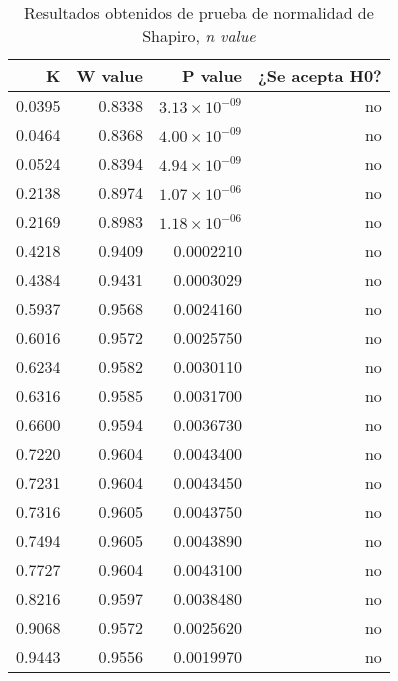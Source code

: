 \documentclass{elsarticle}
\begin{document}
\begin{table}[ht]
    \centering
    \caption{Resultados obtenidos de prueba de normalidad de Shapiro, \textit{n value}} 
    \begin{tabular}{|r|r|r|r|}
    \hline
    K & W value & P value & ¿Se acepta H0?  \\
    \hline
    0.0395 & 0.8338 & $3.13\times 10^{-09}$ & no \\
    \hline 
    0.0464 & 0.8368 & $4.00\times 10^{-09}$ & no  \\
    \hline 
    0.0524 & 0.8394 & $4.94\times 10^{-09}$ & no \\
    \hline
    0.2138 & 0.8974 & $1.07\times 10^{-06}$ & no \\
    \hline
    0.2169 & 0.8983 & $1.18\times 10^{-06}$ & no \\
    \hline
     0.4218 & 0.9409 & 0.0002210 & no \\
    \hline
    0.4384 & 0.9431 & 0.0003029 & no \\
    \hline
    0.5937 & 0.9568 & 0.0024160 & no \\
    \hline
    0.6016 & 0.9572 & 0.0025750 & no \\
    \hline
    0.6234 & 0.9582 & 0.0030110 & no \\
    \hline
    0.6316 & 0.9585 & 0.0031700 & no \\
    \hline
    0.6600 & 0.9594 & 0.0036730 & no \\
    \hline
    0.7220 & 0.9604 & 0.0043400 & no \\
    \hline
    0.7231 & 0.9604 & 0.0043450 & no \\
    \hline
    0.7316 & 0.9605 & 0.0043750 & no \\
    \hline
    0.7494 & 0.9605 & 0.0043890 & no \\
    \hline
    0.7727 & 0.9604 & 0.0043100 & no \\
    \hline
    0.8216 & 0.9597 & 0.0038480 & no \\
    \hline
    0.9068 & 0.9572 & 0.0025620 & no \\
    \hline
    0.9443 & 0.9556 & 0.0019970 & no \\
    \hline 
\end{tabular}
    \label{cuadro 2}
\end{table}
\end{document}
